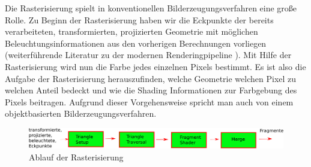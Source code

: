         Die Rasterisierung spielt in konventionellen Bilderzeugungsverfahren eine große Rolle. 
        Zu Beginn der Rasterisierung haben wir die Eckpunkte der bereits verarbeiteten, transformierten, projizierten Geometrie mit möglichen
        Beleuchtungsinformationen aus den vorherigen Berechnungen vorliegen (weiterführende Literatur zu der modernen
        Renderingpipeline \cite{akenine2018real}). 
        Mit Hilfe der Rasterisierung wird nun die Farbe jedes einzelnen Pixels bestimmt. Es ist also die Aufgabe der Rasterisierung herauszufinden, 
        welche Geometrie welchen Pixel zu welchen Anteil bedeckt und wie die Shading Informationen zur Farbgebung des Pixels beitragen. 
        Aufgrund dieser Vorgehensweise spricht man auch von einem objektbasierten Bilderzeugungsverfahren.

        \begin{figure}[H]
            \centering
            \includegraphics[width=\linewidth]{content/PathTracer/Bilder/Rasterisierung.pdf}
            \caption{Ablauf der Rasterisierung}
            \label{pic:Rasterisierungsablauf}
        \end{figure}


